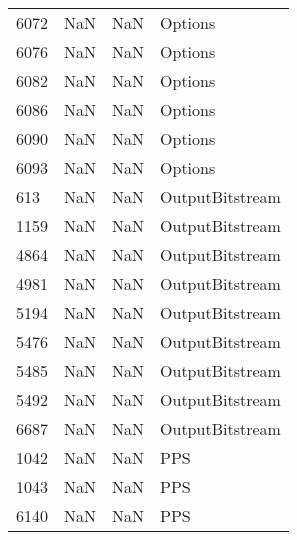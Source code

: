\begin{tabular}{llll}
6072 &                   NaN &                        NaN &                                   Options \\
6076 &                   NaN &                        NaN &                                   Options \\
6082 &                   NaN &                        NaN &                                   Options \\
6086 &                   NaN &                        NaN &                                   Options \\
6090 &                   NaN &                        NaN &                                   Options \\
6093 &                   NaN &                        NaN &                                   Options \\
613  &                   NaN &                        NaN &                           OutputBitstream \\
1159 &                   NaN &                        NaN &                           OutputBitstream \\
4864 &                   NaN &                        NaN &                           OutputBitstream \\
4981 &                   NaN &                        NaN &                           OutputBitstream \\
5194 &                   NaN &                        NaN &                           OutputBitstream \\
5476 &                   NaN &                        NaN &                           OutputBitstream \\
5485 &                   NaN &                        NaN &                           OutputBitstream \\
5492 &                   NaN &                        NaN &                           OutputBitstream \\
6687 &                   NaN &                        NaN &                           OutputBitstream \\
1042 &                   NaN &                        NaN &                                       PPS \\
1043 &                   NaN &                        NaN &                                       PPS \\
6140 &                   NaN &                        NaN &                                       PPS \\

\end{tabular}

